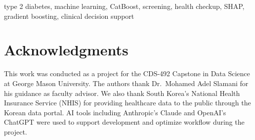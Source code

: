 \documentclass[conference]{IEEEtran}
\begin{document}
\begin{IEEEkeywords}
type 2 diabetes, machine learning, CatBoost, screening, health checkup, SHAP, gradient boosting, clinical decision support
\end{IEEEkeywords}










\section*{Acknowledgments}
This work was conducted as a project for the CDS-492 Capstone in Data Science at George Mason University. The authors thank Dr.\ Mohamed Adel Slamani for his guidance as faculty advisor. We also thank South Korea's National Health Insurance Service (NHIS) for providing healthcare data to the public through the Korean data portal. AI tools including Anthropic's Claude and OpenAI's ChatGPT were used to support development and optimize workflow during the project.



\end{document}
